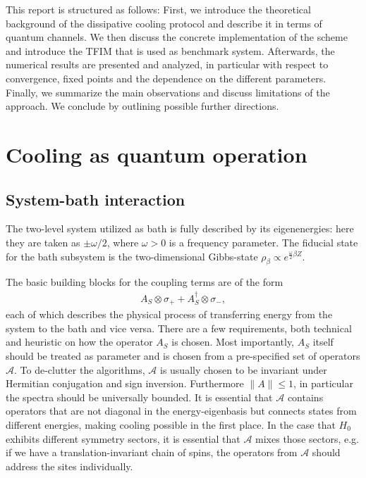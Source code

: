\documentclass[12pt,a4paper]{article}
\begin{document}
This report is structured as follows: First, we introduce the theoretical background of the dissipative cooling protocol and describe it in terms of quantum channels. We then discuss the concrete implementation of the scheme and introduce the TFIM that is used as benchmark system. Afterwards, the numerical results are presented and analyzed, in particular with respect to convergence, fixed points and the dependence on the different parameters. Finally, we summarize the main observations and discuss limitations of the approach. We conclude by outlining  possible further directions.


\section{Cooling as quantum operation}
\subsection{System-bath interaction}
The two-level system utilized as bath is fully described by its eigenenergies: here they are taken as $\pm\omega/2$, where $\omega>0$ is a frequency parameter. The fiducial state for the bath subsystem is the two-dimensional Gibbs-state $\rho_{\beta}\propto e^{\tfrac{\omega}{2}\beta Z }$.

The basic building blocks for the coupling terms are of the form
\begin{align}\label{eq:single_cooling_process}
    A_S \otimes \sigma_+ +A_S^{\dagger} \otimes \sigma_- ,
\end{align}
each of which describes the physical process of transferring energy from the system to the bath and vice versa. There are a few requirements, both technical and heuristic on how the operator $A_S$ is chosen. Most importantly, $A_S$ itself should be treated as parameter and is chosen from a pre-specified set of operators $\mathcal{A}$. To de-clutter the algorithms, $\mathcal{A}$ is usually chosen to be invariant under Hermitian conjugation and sign inversion. Furthermore $\|A\|\le 1$, in particular the spectra should be universally bounded. It is essential that $\mathcal{A}$ contains operators that are not diagonal in the energy-eigenbasis but connects states from different energies, making cooling possible in the first place. In the case that $H_0$ exhibits different symmetry sectors, it is essential that $\mathcal{A}$ mixes those sectors, e.g. if we have a translation-invariant chain of spins, the operators from $\mathcal{A}$ should address the sites individually.  
\end{document}
